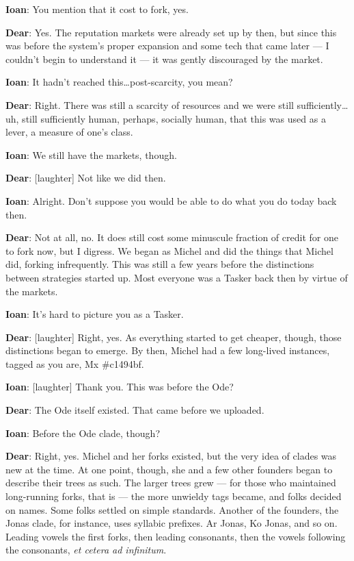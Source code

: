 \textbf{Ioan}: You mention that it cost to fork, yes.

\textbf{Dear}: Yes. The reputation markets were already set up by then, but since this was before the system's proper expansion and some tech that came later — I couldn't begin to understand it — it was gently discouraged by the market.

\textbf{Ioan}: It hadn't reached this\ldots{}post-scarcity, you mean?

\textbf{Dear}: Right. There was still a scarcity of resources and we were still sufficiently\ldots{}uh, still sufficiently human, perhaps, socially human, that this was used as a lever, a measure of one's class.

\textbf{Ioan}: We still have the markets, though.

\textbf{Dear}: {[}laughter{]} Not like we did then.

\textbf{Ioan}: Alright. Don't suppose you would be able to do what you do today back then.

\textbf{Dear}: Not at all, no. It does still cost some minuscule fraction of credit for one to fork now, but I digress. We began as Michel and did the things that Michel did, forking infrequently. This was still a few years before the distinctions between strategies started up. Most everyone was a Tasker back then by virtue of the markets.

\textbf{Ioan}: It's hard to picture you as a Tasker.

\textbf{Dear}: {[}laughter{]} Right, yes. As everything started to get cheaper, though, those distinctions began to emerge. By then, Michel had a few long-lived instances, tagged as you are, Mx \#c1494bf.

\textbf{Ioan}: {[}laughter{]} Thank you. This was before the Ode?

\textbf{Dear}: The Ode itself existed. That came before we uploaded.

\textbf{Ioan}: Before the Ode clade, though?

\textbf{Dear}: Right, yes. Michel and her forks existed, but the very idea of clades was new at the time. At one point, though, she and a few other founders began to describe their trees as such. The larger trees grew — for those who maintained long-running forks, that is — the more unwieldy tags became, and folks decided on names. Some folks settled on simple standards. Another of the founders, the Jonas clade, for instance, uses syllabic prefixes. Ar Jonas, Ko Jonas, and so on. Leading vowels the first forks, then leading consonants, then the vowels following the consonants, \emph{et cetera ad infinitum}.

